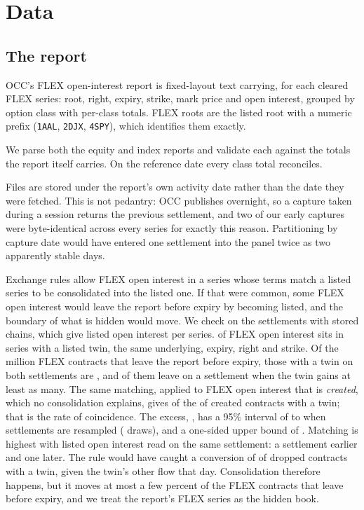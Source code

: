 \documentclass[11pt]{article}
\begin{document}
\section{Data}

\subsection{The report}

OCC's FLEX open-interest report is fixed-layout text carrying, for each cleared FLEX
series: root, right, expiry, strike, mark price and open interest, grouped by option
class with per-class totals. FLEX roots are the listed root with a numeric prefix
(\texttt{1AAL}, \texttt{2DJX}, \texttt{4SPY}), which identifies them exactly.

We parse both the equity and index reports and validate each against the totals the
report itself carries. On the reference date every class total reconciles.

Files are stored under the report's own activity date rather than the date they were
fetched. This is not pedantry: OCC publishes overnight, so a capture taken during a
session returns the previous settlement, and two of our early captures were
byte-identical across every series for exactly this reason. Partitioning by capture
date would have entered one settlement into the panel twice as two apparently stable
days.

Exchange rules allow FLEX open interest in a series whose terms match a listed series to
be consolidated into the listed one. If that were common, some FLEX open interest would
leave the report before expiry by becoming listed, and the boundary of what is hidden
would move. We check on the \ConvSettlements{} settlements with stored chains, which give
listed open interest per series. \ConvTwinShare{} of FLEX open interest sits in series
with a listed twin, the same underlying, expiry, right and strike. Of the
\ConvDropped{} million FLEX contracts that leave the report before expiry, those with a
twin on both settlements are \ConvDroppedTwin{}, and \ConvMatchedTwin{} of them leave on a
settlement when the twin gains at least \ConvMatchShare{} as many. The same matching,
applied to FLEX open interest that is \emph{created}, which no consolidation explains, gives
\ConvCreatedMatchedTwin{} of the \ConvCreatedTwin{} of created contracts with a twin; that is
the rate of coincidence. The excess, \ConvExcess{}, has a 95\% interval of \ConvExcessLow{}
to \ConvExcessHigh{} when settlements are resampled (\ConvBoot{} draws), and a one-sided
upper bound of \ConvExcessUpper{}. Matching is highest with listed open interest read on
the same settlement: \ConvLagBefore{} a settlement earlier and \ConvLagAfter{} one later.
The rule would have caught a conversion of \ConvPower{} of dropped contracts with a twin,
given the twin's other flow that day. Consolidation therefore happens, but it moves at
most a few percent of the FLEX contracts that leave before expiry, and we treat the
report's FLEX series as the hidden book.
\end{document}
